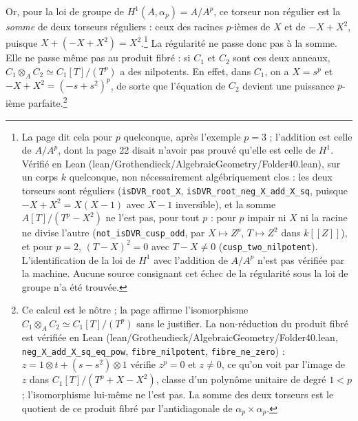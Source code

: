\documentclass[11pt,a4paper]{article}
\begin{document}
Or, pour la loi de groupe de $H^1(A, \alpha_p) = A/A^p$, ce torseur non
régulier est la \emph{somme} de deux torseurs réguliers : ceux des racines
$p$-ièmes de $X$ et de $-X + X^2$, puisque
$X + (-X + X^2) = X^2$.\footnote{La page dit cela pour $p$ quelconque, après
l'exemple $p = 3$ ; l'addition est celle de $A/A^p$, dont la page 22 disait
n'avoir pas prouvé qu'elle est celle de $H^1$. Vérifié en Lean
(lean/Grothendieck/AlgebraicGeometry/Folder40.lean), sur un corps $k$ quelconque, non
nécessairement algébriquement clos : les deux torseurs sont réguliers
(\texttt{isDVR\_root\_X}, \texttt{isDVR\_root\_neg\_X\_add\_X\_sq}, puisque
$-X + X^2 = X(X - 1)$ avec $X - 1$ inversible), et la somme
$A[T]/(T^p - X^2)$ ne l'est pas, pour tout $p$ : pour $p$ impair ni $X$ ni la
racine ne divise l'autre (\texttt{not\_isDVR\_cusp\_odd}, par $X \mapsto
Z^p$, $T \mapsto Z^2$ dans $k[[Z]]$), et pour $p = 2$, $(T - X)^2 = 0$ avec
$T - X \neq 0$ (\texttt{cusp\_two\_nilpotent}). L'identification de la loi
de $H^1$ avec l'addition de $A/A^p$ n'est pas vérifiée par la machine.
Aucune source consignant cet échec de la régularité sous la loi de groupe
n'a été trouvée.} La régularité ne passe donc
pas à la somme. Elle ne passe même pas au produit fibré : si $C_1$ et $C_2$
sont ces deux anneaux, $C_1 \otimes_A C_2 \simeq C_1[T]/(T^p)$ a des
nilpotents. En effet, dans $C_1$, on a $X = s^p$ et
$-X + X^2 = (-s + s^2)^p$, de sorte que l'équation de $C_2$ devient une
puissance $p$-ième parfaite.\footnote{Ce calcul est le nôtre ; la page
affirme l'isomorphisme $C_1 \otimes_A C_2 \simeq C_1[T]/(T^p)$ sans le
justifier. La non-réduction du produit fibré est vérifiée en Lean
(lean/Grothendieck/AlgebraicGeometry/Folder40.lean, \texttt{neg\_X\_add\_X\_sq\_eq\_pow},
\texttt{fibre\_nilpotent}, \texttt{fibre\_ne\_zero}) : $z = 1 \otimes t + (s -
s^2) \otimes 1$ vérifie $z^p = 0$ et $z \neq 0$, ce qu'on voit par l'image de
$z$ dans $C_1[T]/(T^p + X - X^2)$, classe d'un polynôme unitaire de degré
$1 < p$ ; l'isomorphisme lui-même ne l'est pas. La somme des deux torseurs est le quotient de ce produit fibré par
l'antidiagonale de $\alpha_p \times \alpha_p$.}
\end{document}
